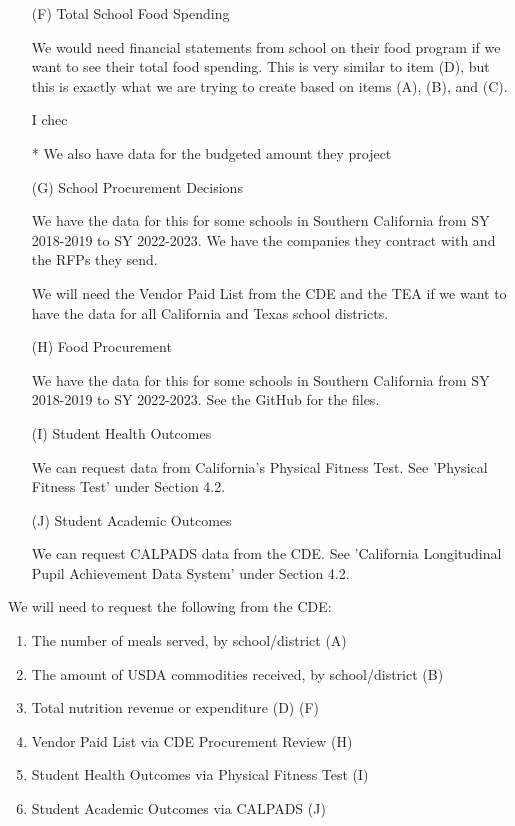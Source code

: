 \documentclass[12pt]{article}
\begin{document}
\begin{enumerate}
	\item[(F)] Total School Food Spending
	
	We would need financial statements from school on their food program if we want to see their total food spending. This is very similar to item (D), but this is exactly what we are trying to create based on items (A), (B), and (C).
	
	I chec
	
	* We also have data for the budgeted amount they project 
	
	\item[(G)] School Procurement Decisions
	
	We have the data for this for some schools in Southern California from SY 2018-2019 to SY 2022-2023. We have the companies they contract with and the RFPs they send. 
	
	We will need the Vendor Paid List from the CDE and the TEA if we want to have the data for all California and Texas school districts. 
	
	\item[(H)] Food Procurement 
	
	We have the data for this for some schools in Southern California from SY 2018-2019 to SY 2022-2023. See the GitHub for the files.
	
	\item[(I)] Student Health Outcomes
	
	We can request data from California's Physical Fitness Test. See 'Physical Fitness Test' under Section 4.2.
	
	\item[(J)] Student Academic Outcomes
	
	We can request CALPADS data from the CDE. See 'California Longitudinal Pupil Achievement Data System' under Section 4.2.
	
\end{enumerate}

We will need to request the following from the CDE:
\begin{enumerate}
	\item The number of meals served, by school/district (A)
	\item The amount of USDA commodities received, by school/district (B)
	\item Total nutrition revenue or expenditure (D) (F)
	\item Vendor Paid List via CDE Procurement Review (H)
	\item Student Health Outcomes via Physical Fitness Test (I)
	\item Student Academic Outcomes via CALPADS (J)
\end{enumerate}
\end{document}
